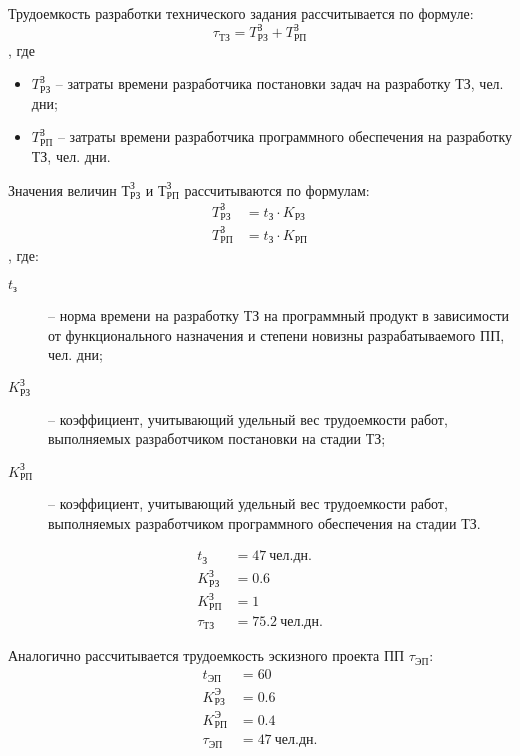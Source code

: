 \documentclass[a4paper,12pt]{article}\usepackage[]{graphicx}\usepackage[]{color}
\numberwithin{equation}{section}
\newcommand{\un}[1]{\: \mathit{#1}} %
\begin{document}
Трудоемкость  разработки  технического  задания  рассчитывается  по 
формуле:
\begin{equation}
  \tau_{ТЗ} = T_{РЗ}^З + T_{РП}^З
\end{equation}
, где
\begin{itemize}
\item $T_{РЗ}^З$ -- затраты времени разработчика постановки задач на разработку
  ТЗ, чел.  дни;
\item $T_{РП}^З$ -- затраты времени разработчика программного обеспечения на
  разработку ТЗ, чел. дни.
\end{itemize}
Значения величин $Т_{РЗ}^З$ и $Т_{РП}^З$ рассчитываются по формулам:
\begin{align*}
  T_{РЗ}^З &= t_З \cdot K_{РЗ} \\
  T_{РП}^З &= t_З \cdot K_{РП}
\end{align*}
, где:
\begin{description}
\item[$t_з$] -- норма времени на разработку ТЗ на программный продукт в
  зависимости от функционального назначения и степени новизны разрабатываемого ПП,
  чел. дни;
\item[$K_{РЗ}^З$] -- коэффициент, учитывающий удельный вес трудоемкости работ,
  выполняемых разработчиком постановки на стадии ТЗ;
\item[$K_{РП}^З$] -- коэффициент, учитывающий удельный вес трудоемкости работ,
  выполняемых разработчиком программного обеспечения на стадии ТЗ.
\end{description}

\begin{align*}
  t_З &= 47 \un{чел.дн.} \\
  K_{РЗ}^З &= 0.6 \\
  K_{РП}^З &= 1 \\
  \tau_{ТЗ} &= 75.2 \un{чел.дн.}
\end{align*}

Аналогично рассчитывается трудоемкость эскизного проекта ПП $\tau_{ЭП}$:
\begin{align*}
  t_{ЭП} &= 60 \\
  K_{РЗ}^Э &= 0.6 \\
  K_{РП}^Э &= 0.4 \\
  \tau_{ЭП} &= 47 \un{чел.дн.}
\end{align*}
\end{document}
